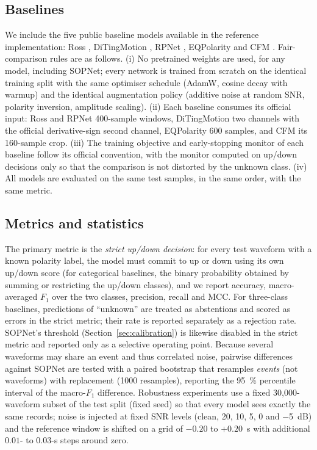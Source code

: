 \documentclass[11pt]{article}
\begin{document}
\subsection{Baselines}
\label{sec:baselines}

We include the five public baseline models available in the reference
implementation: Ross \citep{ross2018}, DiTingMotion \citep{zhao2023ditingmotion},
RPNet \citep{han2025rpnet}, EQPolarity \citep{chen2024eqpolarity} and CFM
\citep{messuti2023cfm}. Fair-comparison rules are as follows. (i) No pretrained
weights are used, for any model, including SOPNet; every network is trained
from scratch on the identical training split with the same optimiser schedule
(AdamW, cosine decay with warmup) and the identical augmentation policy
(additive noise at random SNR, polarity inversion, amplitude scaling). (ii) Each baseline consumes its official input: Ross and
RPNet 400-sample windows, DiTingMotion two channels with the official
derivative-sign second channel, EQPolarity 600 samples, and CFM its 160-sample
crop. (iii) The training objective and early-stopping monitor of each baseline
follow its official convention, with the monitor computed on up/down decisions
only so that the comparison is not distorted by the unknown class. (iv) All
models are evaluated on the same test samples, in the same order, with the
same metric.

\subsection{Metrics and statistics}
\label{sec:metrics}

The primary metric is the \emph{strict up/down decision}: for every test
waveform with a known polarity label, the model must commit to up or down
using its own up/down score (for categorical baselines, the binary
probability obtained by summing or restricting the up/down classes), and we
report accuracy, macro-averaged $F_1$ over the two classes, precision, recall
and MCC. For three-class baselines, predictions of ``unknown'' are treated as
abstentions and scored as errors in the strict metric; their rate is reported
separately as a rejection rate. SOPNet's threshold (Section~\ref{sec:calibration})
is likewise disabled in the strict metric and reported only as a selective
operating point. Because several waveforms may share an event and thus
correlated noise, pairwise differences against SOPNet are tested with a
paired bootstrap that resamples \emph{events} (not waveforms) with replacement
(1000 resamples), reporting the \SI{95}{\percent} percentile interval
of the macro-$F_1$ difference. Robustness experiments use a fixed
30{,}000-waveform subset of the test split (fixed seed) so that every
model sees exactly the same records; noise is injected at fixed SNR levels
(clean, 20, 10, 5, 0 and \SI{-5}{dB}) and the reference window is shifted on a
grid of $-0.20$ to $+0.20$~s with additional $0.01$- to $0.03$-s steps around
zero.
\end{document}
